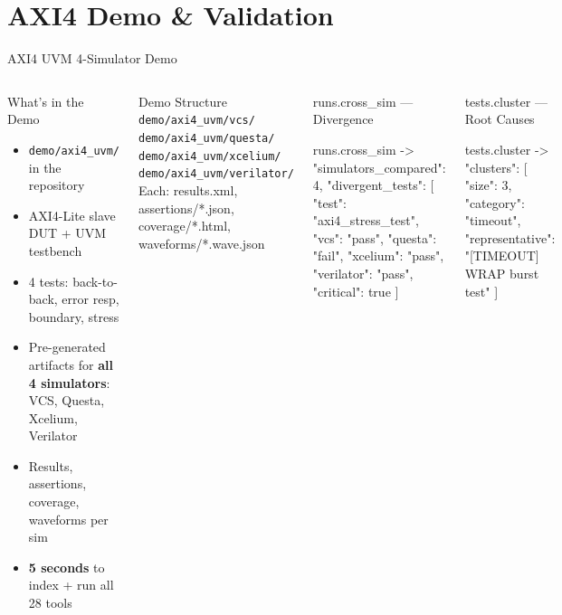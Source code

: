 \documentclass[aspectratio=169,t]{beamer}
\begin{document}
\section{AXI4 Demo \& Validation}
\begin{frame}[fragile]{AXI4 UVM 4-Simulator Demo}
  \begin{columns}[T]
      \begin{block}{What's in the Demo}
        \small
        \begin{itemize}
          \item \texttt{demo/axi4\_uvm/} in the repository
          \item AXI4-Lite slave DUT + UVM testbench
          \item 4 tests: back-to-back, error resp, boundary, stress
          \item Pre-generated artifacts for \textbf{all 4 simulators}:
                VCS, Questa, Xcelium, Verilator
          \item Results, assertions, coverage, waveforms per sim
          \item \textbf{5 seconds} to index + run all 28 tools
        \end{itemize}
      \end{block}
      \vspace{0.3em}
      \begin{block}{Demo Structure}
        \footnotesize
        \texttt{demo/axi4\_uvm/vcs/} \\
        \texttt{demo/axi4\_uvm/questa/} \\
        \texttt{demo/axi4\_uvm/xcelium/} \\
        \texttt{demo/axi4\_uvm/verilator/} \\
        Each: results.xml, assertions/*.json,\\
        coverage/*.html, waveforms/*.wave.json
      \end{block}

      \begin{exampleblock}{runs.cross\_sim — Divergence}
\begin{semiverbatim}\color{white}
runs.cross_sim -> {
  "simulators_compared": 4,
  "divergent_tests": [
    {
      "test": "axi4_stress_test",
      "vcs": "pass",
      "questa": "fail",
      "xcelium": "pass",
      "verilator": "pass",
      "critical": true
    }
  ]
}
\end{semiverbatim}
      \end{exampleblock}
      \vspace{0.2em}
      \begin{exampleblock}{tests.cluster — Root Causes}
\begin{semiverbatim}\color{white}
tests.cluster -> {
  "clusters": [
    {
      "size": 3,
      "category": "timeout",
      "representative":
        "[TIMEOUT] WRAP burst test"
    }
  ]
}
\end{semiverbatim}
      \end{exampleblock}
  \end{columns}
\end{frame}
\end{document}
